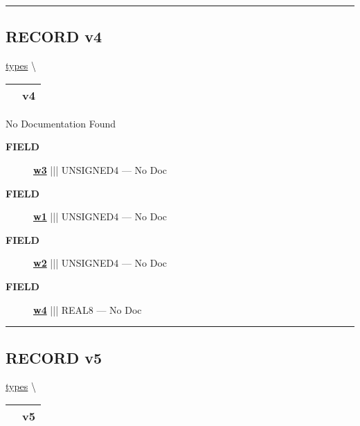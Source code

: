 \rule{\linewidth}{0.5pt}
\subsection*{\textsf{\colorbox{headtoc}{\color{white} RECORD}
v4}}

\hypertarget{ecldoc:types.v4}{}
\hspace{0pt} \hyperlink{ecldoc:types}{types} \textbackslash 

{\renewcommand{\arraystretch}{1.5}
\begin{tabularx}{\textwidth}{|>{\raggedright\arraybackslash}l|X|}
\hline
\hspace{0pt}\mytexttt{\color{red} } & \textbf{v4} \\
\hline
\end{tabularx}
}

\par





No Documentation Found







\par
\begin{description}
\item [\colorbox{tagtype}{\color{white} \textbf{\textsf{FIELD}}}] \textbf{\underline{w3}} ||| UNSIGNED4 --- No Doc
\item [\colorbox{tagtype}{\color{white} \textbf{\textsf{FIELD}}}] \textbf{\underline{w1}} ||| UNSIGNED4 --- No Doc
\item [\colorbox{tagtype}{\color{white} \textbf{\textsf{FIELD}}}] \textbf{\underline{w2}} ||| UNSIGNED4 --- No Doc
\item [\colorbox{tagtype}{\color{white} \textbf{\textsf{FIELD}}}] \textbf{\underline{w4}} ||| REAL8 --- No Doc
\end{description}





\rule{\linewidth}{0.5pt}
\subsection*{\textsf{\colorbox{headtoc}{\color{white} RECORD}
v5}}

\hypertarget{ecldoc:types.v5}{}
\hspace{0pt} \hyperlink{ecldoc:types}{types} \textbackslash 

{\renewcommand{\arraystretch}{1.5}
\begin{tabularx}{\textwidth}{|>{\raggedright\arraybackslash}l|X|}
\hline
\hspace{0pt}\mytexttt{\color{red} } & \textbf{v5} \\
\hline
\end{tabularx}
}

